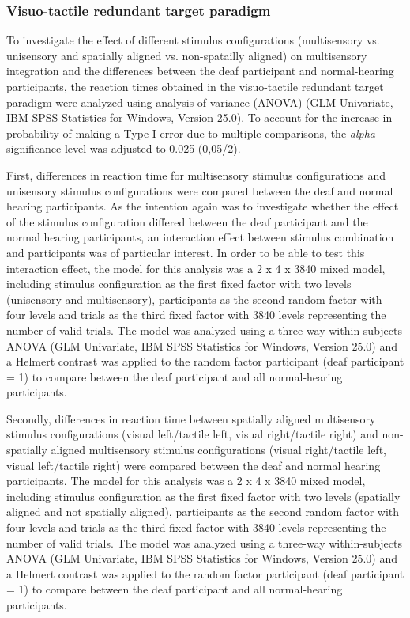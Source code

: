 \documentclass[12pt]{article}
\begin{document}
\subsubsection{Visuo-tactile redundant target paradigm}
To investigate the effect of different stimulus configurations (multisensory vs. unisensory and spatially aligned vs. non-spatailly aligned) on multisensory integration and the differences between the deaf participant and normal-hearing participants, the reaction times obtained in the visuo-tactile redundant target paradigm were analyzed using analysis of variance (ANOVA) (GLM Univariate, IBM SPSS Statistics for Windows, Version 25.0). To account for the increase in probability of making a Type I error due to multiple comparisons, the \textit{alpha} significance level was adjusted to 0.025 (0,05/2). 
%
\par First, differences in reaction time for multisensory stimulus configurations and unisensory stimulus configurations were compared between the deaf and normal hearing participants. As the intention again was to investigate whether the effect of the stimulus configuration differed between the deaf participant and the normal hearing participants, an interaction effect between stimulus combination and participants was of particular interest. In order to be able to test this interaction effect, the model for this analysis was a 2 x 4 x 3840 mixed model, including stimulus configuration as the first fixed factor with two levels (unisensory and multisensory), participants as the second random factor with four levels and trials as the third fixed factor with 3840 levels representing the number of valid trials. The model was analyzed using a three-way within-subjects ANOVA (GLM Univariate, IBM SPSS Statistics for Windows, Version 25.0) and a Helmert contrast was applied to the random factor participant (deaf participant = 1) to compare between the deaf participant and all normal-hearing participants. 
%
\par Secondly, differences in reaction time between spatially aligned multisensory stimulus configurations (visual left/tactile left, visual right/tactile right) and non-spatially aligned multisensory stimulus configurations (visual right/tactile left, visual left/tactile right) were compared between the deaf and normal hearing participants. The model for this analysis was a 2 x 4 x 3840 mixed model, including stimulus configuration as the first fixed factor with two levels (spatially aligned and not spatially aligned), participants as the second random factor with four levels and trials as the third fixed factor with 3840 levels representing the number of valid trials. The model was analyzed using a three-way within-subjects ANOVA (GLM Univariate, IBM SPSS Statistics for Windows, Version 25.0) and a Helmert contrast was applied to the random factor participant (deaf participant = 1) to compare between the deaf participant and all normal-hearing participants.
\end{document}
